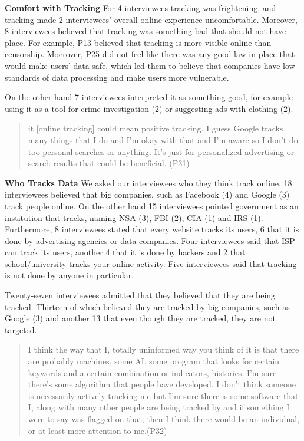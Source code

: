 \textbf{Comfort with Tracking} For 4 interviewees tracking was frightening,
and tracking made 2 interviewees' overall online experience uncomfortable.
Moreover, 8 interviewees believed that tracking was something bad that should
not have place. For example, P13 believed that tracking is more visible online
than censorship.
Moerover, P25 did not feel like there was any good law in place that would
make users' data safe, which led them to believe that companies have low
standards of data processing and make users more vulnerable. 

On the other hand 7 interviewees interpreted it as something good, for example
using it as a tool for crime investigation (2) or suggesting ads with clothing
(2). 

\begin{quote} it [online tracking] could mean positive tracking. I guess
Google tracks many things that I do and I'm okay with that and I'm aware so I
don't do too personal searches or anything. It's just for personalized
advertising or search results that could be beneficial. (P31) \end{quote}


\textbf{Who Tracks Data} We asked our interviewees who they think track
online. 18 interviewees believed that big companies, such as Facebook (4) and
Google (3) track people online. On the other hand 15 interviewees pointed
government as an institution that tracks, naming NSA (3), FBI (2), CIA (1) and
IRS (1). Furthermore, 8 interviewees stated that every website tracks its
users, 6 that it is done by advertising agencies or data companies. Four
interviewees said that ISP can track its users, another 4 that it is done by
hackers and 2 that school/university tracks your online activity. Five
interviewees said that tracking is not done by anyone in particular.

Twenty-seven interviewees admitted that they believed that they are being
tracked. Thirteen of which believed they are tracked by big companies, such as
Google (3) and another 13 that even though they are tracked, they are not
targeted. 


\begin{quote}I think the way that I, totally uninformed way you think of it is
that there are probably machines, some AI, some program that looks for certain
keywords and a certain combination or indicators, histories. I'm sure there's
some algorithm that people have developed. I don't think someone is
necessarily actively tracking me but I'm sure there is some software that I,
along with many other people are being tracked by and if something I were to
say was flagged on that, then I think there would be an individual, or at
least more attention to me.(P32)\end{quote}


